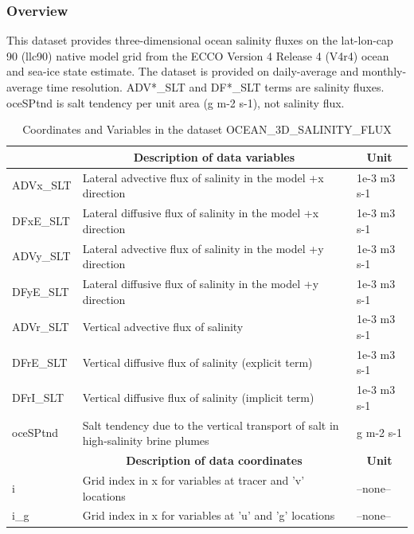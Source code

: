 \subsubsection{Overview}
This dataset provides three-dimensional ocean salinity fluxes on the lat-lon-cap 90 (llc90) native model grid from the ECCO Version 4 Release 4 (V4r4) ocean and sea-ice state estimate. The dataset is provided on daily-average and monthly-average time resolution. ADV*\_SLT and DF*\_SLT terms are salinity fluxes. oceSPtnd is salt tendency per unit area (g m-2 s-1), not salinity flux. 
\begin{longtable}{|m{}|m{}|m{}|}
\caption{Coordinates and Variables in the dataset OCEAN\_3D\_SALINITY\_FLUX}
\label{tab:table-OCEAN_3D_SALINITY_FLUX-fields} \\ 
\hline \endhead \hline \endfoot
\rowcolor{lightgray} \multicolumn{1}{|c|}{\textbf{Variables}} & \multicolumn{1}{|c|}{\textbf{Description of data variables}} &  \multicolumn{1}{|c|}{\textbf{Unit}}\\ \hline
ADVx\_SLT &Lateral advective flux of salinity in the model +x direction &1e-3 m3 s-1  \\ \hline
DFxE\_SLT &Lateral diffusive flux of salinity in the model +x direction &1e-3 m3 s-1  \\ \hline
ADVy\_SLT &Lateral advective flux of salinity in the model +y direction &1e-3 m3 s-1  \\ \hline
DFyE\_SLT &Lateral diffusive flux of salinity in the model +y direction &1e-3 m3 s-1  \\ \hline
ADVr\_SLT &Vertical advective flux of salinity &1e-3 m3 s-1  \\ \hline
DFrE\_SLT &Vertical diffusive flux of salinity (explicit term) &1e-3 m3 s-1  \\ \hline
DFrI\_SLT &Vertical diffusive flux of salinity (implicit term) &1e-3 m3 s-1  \\ \hline
oceSPtnd &Salt tendency due to the vertical transport of salt in high-salinity brine plumes &g m-2 s-1  \\ \hline
\rowcolor{lightgray} \multicolumn{1}{|c|}{\textbf{Coordinates}} & \multicolumn{1}{|c|}{\textbf{Description of data coordinates}} &  \multicolumn{1}{|c|}{\textbf{Unit}}\\ \hline
i &Grid index in x for variables at tracer and 'v' locations &--none--  \\ \hline
i\_g &Grid index in x for variables at 'u' and 'g' locations &--none--  \\ \hline

\end{longtable}
